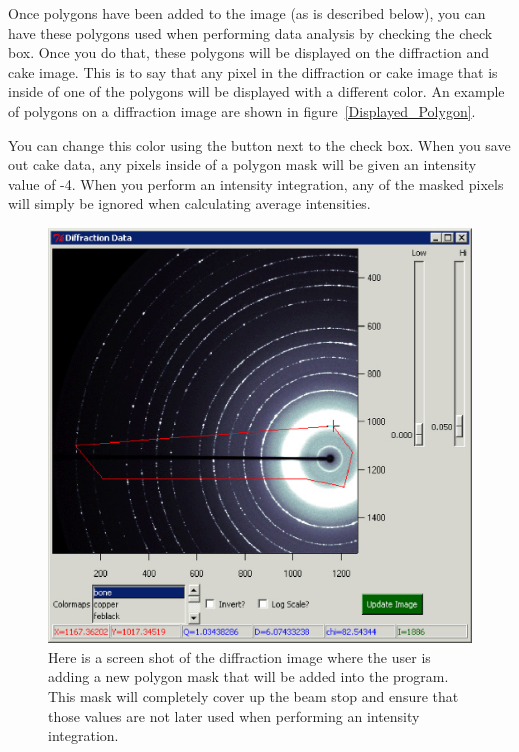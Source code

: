 Once polygons have been added to the image (as is 
described below), you can have these polygons
used when performing data analysis by checking the
 check box. Once you do that,
these polygons will be displayed on the diffraction
and cake image. This is to say that any pixel in
the diffraction or cake image that is inside of one of
the polygons will be displayed with a different color.
An example of polygons on a diffraction image are 
shown in figure~\ref{Displayed_Polygon}.

You can change this color using the  button
next to the  check box.
When you save out cake data, any pixels inside of 
a polygon mask will be given an intensity 
value of -4. When you perform an intensity integration,
any of the masked pixels will simply be ignored when
calculating average intensities.

\begin{figure}
    \centering
    \includegraphics[scale=.75]{figures/Adding_Polygon.eps}
    \caption{Here is a screen shot of the diffraction
    image where the user is adding a new polygon 
    mask that will be added into the program.
    This mask will completely cover up the beam stop
    and ensure that those values are not later used
    when performing an intensity integration.}
    \label{Adding_Polygon}
\end{figure}

